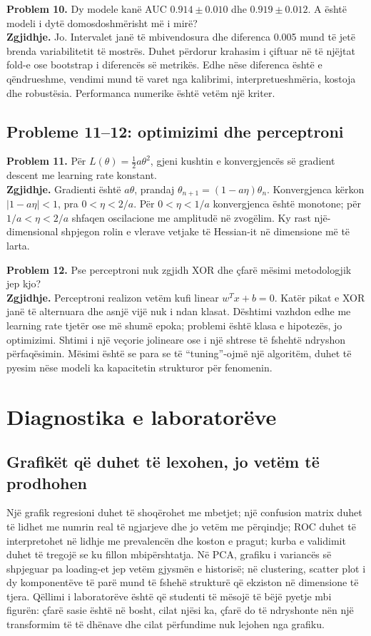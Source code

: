 \documentclass[12pt,a4paper,oneside]{book}
\begin{document}
\textbf{Problem 10.} Dy modele kanë AUC $0.914\pm0.010$ dhe $0.919\pm0.012$. A është modeli i dytë domosdoshmërisht më i mirë?\\
\textbf{Zgjidhje.} Jo. Intervalet janë të mbivendosura dhe diferenca 0.005 mund të jetë brenda variabilitetit të mostrës. Duhet përdorur krahasim i çiftuar në të njëjtat fold-e ose bootstrap i diferencës së metrikës. Edhe nëse diferenca është e qëndrueshme, vendimi mund të varet nga kalibrimi, interpretueshmëria, kostoja dhe robustësia. Performanca numerike është vetëm një kriter.

\section{Probleme 11--12: optimizimi dhe perceptroni}
\textbf{Problem 11.} Për $L(\theta)=\tfrac12a\theta^2$, gjeni kushtin e konvergjencës së gradient descent me learning rate konstant.\\
\textbf{Zgjidhje.} Gradienti është $a\theta$, prandaj $\theta_{n+1}=(1-a\eta)\theta_n$. Konvergjenca kërkon $|1-a\eta|<1$, pra $0<\eta<2/a$. Për $0<\eta<1/a$ konvergjenca është monotone; për $1/a<\eta<2/a$ shfaqen oscilacione me amplitudë në zvogëlim. Ky rast një-dimensional shpjegon rolin e vlerave vetjake të Hessian-it në dimensione më të larta.

\textbf{Problem 12.} Pse perceptroni nuk zgjidh XOR dhe çfarë mësimi metodologjik jep kjo?\\
\textbf{Zgjidhje.} Perceptroni realizon vetëm kufi linear $w^Tx+b=0$. Katër pikat e XOR janë të alternuara dhe asnjë vijë nuk i ndan klasat. Dështimi vazhdon edhe me learning rate tjetër ose më shumë epoka; problemi është klasa e hipotezës, jo optimizimi. Shtimi i një veçorie jolineare ose i një shtrese të fshehtë ndryshon përfaqësimin. Mësimi është se para se të “tuning”-ojmë një algoritëm, duhet të pyesim nëse modeli ka kapacitetin strukturor për fenomenin.

\chapter[Diagnostika laboratorike]{Diagnostika e laboratorëve}
\section{Grafikët që duhet të lexohen, jo vetëm të prodhohen}
Një grafik regresioni duhet të shoqërohet me mbetjet; një confusion matrix duhet të lidhet me numrin real të ngjarjeve dhe jo vetëm me përqindje; ROC duhet të interpretohet në lidhje me prevalencën dhe koston e pragut; kurba e validimit duhet të tregojë se ku fillon mbipërshtatja. Në PCA, grafiku i variancës së shpjeguar pa loading-et jep vetëm gjysmën e historisë; në clustering, scatter plot i dy komponentëve të parë mund të fshehë strukturë që ekziston në dimensione të tjera. Qëllimi i laboratorëve është që studenti të mësojë të bëjë pyetje mbi figurën: çfarë sasie është në bosht, cilat njësi ka, çfarë do të ndryshonte nën një transformim të të dhënave dhe cilat përfundime nuk lejohen nga grafiku.
\end{document}
